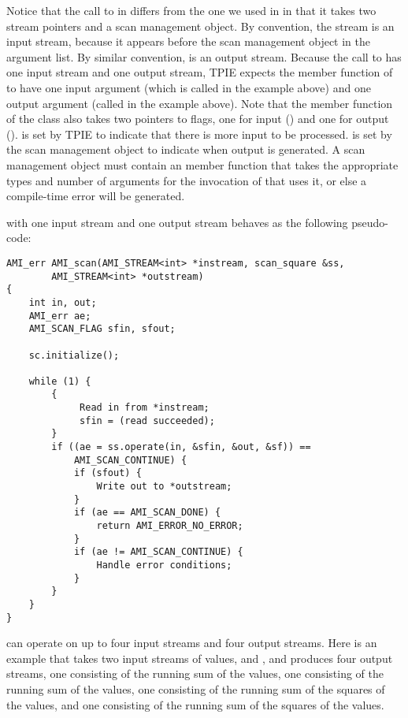 Notice that the call to  in 
differs from the one we used in  in that it
takes two stream pointers and a scan management object.  By
convention, the stream  is an input stream,
because it appears before the scan management object
 in the argument list.  By similar convention,
 is an output stream.  Because the call to
 has one input stream and one output
stream, TPIE expects the  member function
of  to have one input argument (which is called
 in the example above) and one output argument
(called  in the example above).  Note that the
 member function of the class
 also takes two pointers to flags, one
for input () and one for output
().   is set by TPIE to indicate
that there is more input to be processed.  
is set by the scan management object to indicate when output
is generated.  A scan management object must contain an
 member function that takes the
appropriate types and number of arguments for the invocation
of  that uses it, or else a compile-time
error will be generated.

 with one input stream and one output stream
behaves as the following pseudo-code:

\begin{verbatim} 
AMI_err AMI_scan(AMI_STREAM<int> *instream, scan_square &ss, 
        AMI_STREAM<int> *outstream)
{
    int in, out;
    AMI_err ae;    
    AMI_SCAN_FLAG sfin, sfout;

    sc.initialize();

    while (1) {
        {
             Read in from *instream;
             sfin = (read succeeded);
        }
        if ((ae = ss.operate(in, &sfin, &out, &sf)) == 
            AMI_SCAN_CONTINUE) {
            if (sfout) {
                Write out to *outstream;
            }
            if (ae == AMI_SCAN_DONE) {
                return AMI_ERROR_NO_ERROR;
            }
            if (ae != AMI_SCAN_CONTINUE) {
                Handle error conditions;
            }
        }
    }
}
\end{verbatim}

 can operate on up to four input streams
and four output streams.  Here is an example that takes two
input streams of values,  and , and
produces four output streams, one consisting of the running
sum of the  values, one consisting of the running
sum of the  values, one consisting of the running
sum of the squares of the  values, and one
consisting of the running sum of the squares of the
 values.

